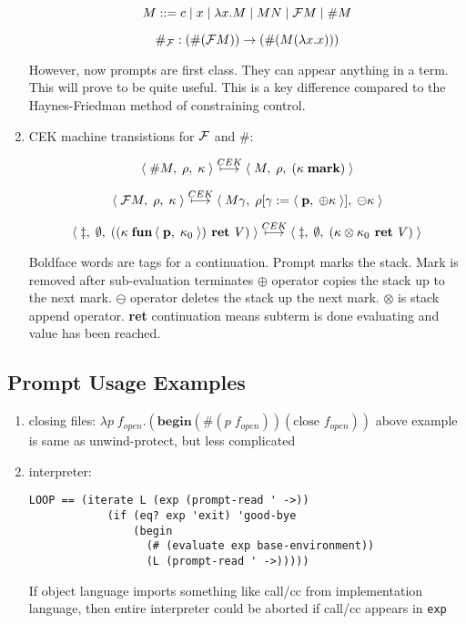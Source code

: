 \documentclass[letterpaper]{llncs}
\begin{document}
\begin{enumerate}
	$$M ::= c \mid x \mid \lambda x.M \mid M N \mid  \mathcal{F}  M \mid \# M$$

	$$\#_{ \mathcal{F} }: (\# ( \mathcal{F}  M)) \rightarrow (\# (M (\lambda x.x)))$$
	
	However, now prompts are first class. They can appear anything in a term. This will prove to be quite useful. This is a key difference compared to the Haynes-Friedman method of constraining control.
	
	\item CEK machine transistions for $ \mathcal{F} $ and \#:
	
	$$ \left\langle \;  \# M , \;  \rho , \;  \kappa  \; \right\rangle  
	        \stackrel{CEK}{\longmapsto}   
	   \left\langle \;  M , \;  \rho , \;  (\kappa \; \textbf{mark})  \; \right\rangle $$
	
	$$ \left\langle \;   \mathcal{F}  M , \;  \rho , \;  \kappa  \; \right\rangle  
	        \stackrel{CEK}{\longmapsto}   
	   \left\langle \;  M \gamma , \;  \rho[\gamma :=  \left\langle \;  \textbf{p} , \;  \oplus \kappa  \; \right\rangle ] , \;  \ominus \kappa  \; \right\rangle $$
	  
	$$ \left\langle \;  \ddagger , \;  \emptyset , \;  ((\kappa \; \textbf{fun}  \left\langle \; \textbf{p}, \; \kappa_0 \; \right\rangle ) \textbf{ ret } V)  \; \right\rangle  
	        \stackrel{CEK}{\longmapsto}  
	   \left\langle \;  \ddagger , \;  \emptyset , \;  (\kappa \otimes \kappa_0 \textbf{ ret } V)  \; \right\rangle $$
	
	Boldface words are tags for a continuation. Prompt marks the stack. Mark is removed after sub-evaluation terminates $\oplus$ operator copies the stack up to the next mark. $\ominus$ operator deletes the stack up the next mark. $\otimes$ is stack append operator. \textbf{ret} continuation means subterm is done evaluating and value has been reached.
	

\end{enumerate}


\subsection*{Prompt Usage Examples}
\begin{enumerate}
	\item closing files: $\lambda p \; f_{open}.(\textbf{begin} (\#(p \; f_{open})) (\textrm{close } f_{open}))$
	above example is same as unwind-protect, but less complicated
	\item interpreter: 
\begin{verbatim}
LOOP == (iterate L (exp (prompt-read ' ->))
	        (if (eq? exp 'exit) 'good-bye
	            (begin
	              (# (evaluate exp base-environment))
	              (L (prompt-read ' ->)))))
\end{verbatim}
If object language imports something like call/cc from implementation language, then entire interpreter could be aborted if call/cc appears in \texttt{exp}
\end{enumerate}
\end{document}
